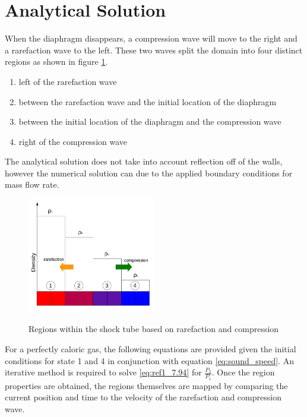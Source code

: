     \section{Analytical Solution}
    
    When the diaphragm disappears, a compression wave will move to the right and a
    rarefaction wave to the left. These two waves split the domain into four
    distinct regions as shown in figure \ref{fig:V2_pressure_scaling}. 
    
    \begin{enumerate}
      \item left of the rarefaction wave
      \item between the rarefaction wave and the initial location of the diaphragm
      \item between the initial location of the diaphragm and the compression wave
      \item right of the compression wave
    \end{enumerate}
    
    The analytical solution does not take into account reflection off of the
    walls, however the numerical solution can due to the applied boundary
    conditions for mass flow rate.
    
    \begin{figure}[!h]
    	\centering
    	\includegraphics[width=0.50\textwidth]{images/Shock_Tube/Shock_Tube_regions}
    	\label{fig:V2_pressure_scaling}
    	\caption{Regions within the shock tube based on rarefaction and compression}
    \end{figure}
    
    For a perfectly caloric gas, the following equations are provided
    \cite[p. 238]{Anderson1990} given the initial conditions for state 1 and
    4 in conjunction with equation \ref{eq:sound_speed}. An iterative method is
    required to solve \ref{eq:ref1_7.94} for $\frac{P_{2}}{P_{1}}$. Once the region
    properties are obtained, the regions themselves are mapped by comparing the
    current position and time to the velocity of the rarefaction and compression
    wave. 
    
